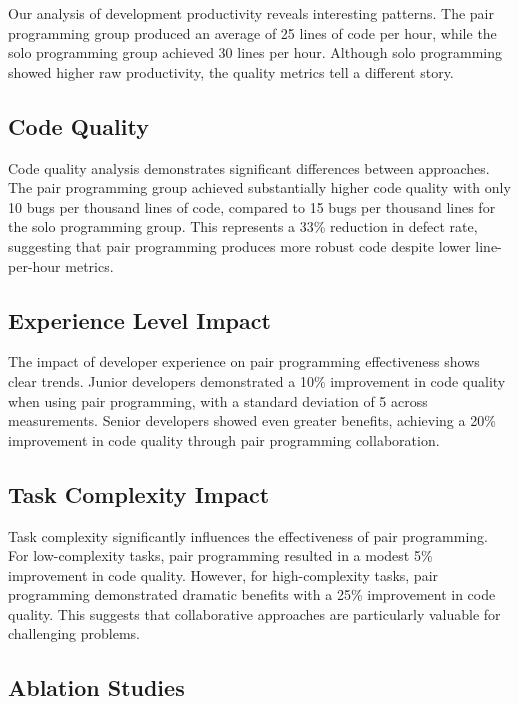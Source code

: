 \documentclass[12pt,a4paper]{article}
\theoremstyle{definition}
\theoremstyle{remark}
\begin{document}
Our analysis of development productivity reveals interesting patterns. The pair programming group produced an average of 25 lines of code per hour, while the solo programming group achieved 30 lines per hour. Although solo programming showed higher raw productivity, the quality metrics tell a different story.

\subsection{Code Quality}
\label{subsec:codequality}

Code quality analysis demonstrates significant differences between approaches. The pair programming group achieved substantially higher code quality with only 10 bugs per thousand lines of code, compared to 15 bugs per thousand lines for the solo programming group. This represents a 33\% reduction in defect rate, suggesting that pair programming produces more robust code despite lower line-per-hour metrics.

\subsection{Experience Level Impact}
\label{subsec:experience}

The impact of developer experience on pair programming effectiveness shows clear trends. Junior developers demonstrated a 10\% improvement in code quality when using pair programming, with a standard deviation of 5 across measurements. Senior developers showed even greater benefits, achieving a 20\% improvement in code quality through pair programming collaboration.

\subsection{Task Complexity Impact}
\label{subsec:complexity}

Task complexity significantly influences the effectiveness of pair programming. For low-complexity tasks, pair programming resulted in a modest 5\% improvement in code quality. However, for high-complexity tasks, pair programming demonstrated dramatic benefits with a 25\% improvement in code quality. This suggests that collaborative approaches are particularly valuable for challenging problems.

\subsection{Ablation Studies}
\label{subsec:ablation}
\end{document}
